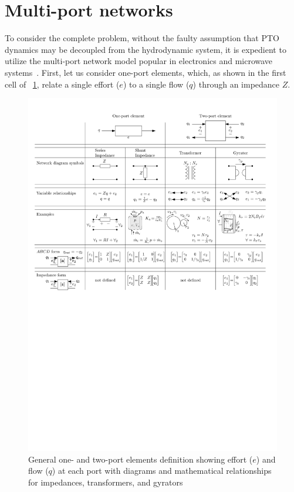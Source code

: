 \documentclass[lettersize,journal]{IEEEtran}
\newcommand{\rc}[1]{\textcolor{red}{#1}}
\begin{document}
\section{Multi-port networks}\label{sec:multi_port_networks}
To consider the complete problem, without the faulty assumption that PTO dynamics may be decoupled from the hydrodynamic system, it is expedient to utilize the multi-port network model popular in electronics and microwave systems~\cite{Marrocco:2008aa,CircuitFundamental}. 
First, let us consider one-port elements, which, as shown in the first cell of \figurename~\ref{fig:wec_as_multiport_transformer_gyrator}, relate a single effort ($e$) to a single flow ($q$) through an impedance $Z$.

\begin{figure}
	\centering
	\includegraphics[width=\textwidth]{wec_as_multiport_transformer_gyrator_impedance_Z_A.pdf}
	\caption{General one- and two-port elements definition showing effort ($e$) and flow ($q$) at each port with diagrams and mathematical relationships for impedances, transformers, and gyrators}
	\label{fig:wec_as_multiport_transformer_gyrator}
\end{figure}
\end{document}
